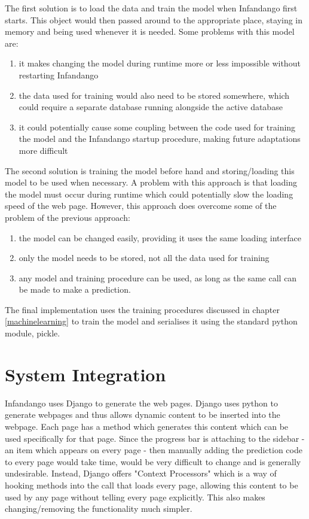 The first solution is to load the data and train the model when Infandango first starts. This object would then passed around to the appropriate place, staying in memory and being used whenever it is needed. Some problems with this model are:

\begin{enumerate}
\item it makes changing the model during runtime more or less impossible without restarting Infandango
\item the data used for training would also need to be stored somewhere, which could require a separate database running alongside the active database \item it could potentially cause some coupling between the code used for training the model and the Infandango startup procedure, making future adaptations more difficult
\end{enumerate}

The second solution is training the model before hand and storing/loading this model to be used when necessary. A problem with this approach is that loading the model must occur during runtime which could potentially slow the loading speed of the web page. However, this approach does overcome some of the problem of the previous approach: 

\begin{enumerate}
\item the model can be changed easily, providing it uses the same loading interface
\item only the model needs to be stored, not all the data used for training
\item any model and training procedure can be used, as long as the same call can be made to make a prediction.
\end{enumerate}

The final implementation uses the training procedures discussed in chapter \ref{machinelearning} to train the model and serialises it using the standard python module, pickle\cite{pythonpickle_site}.

\section{System Integration}
Infandango uses Django to generate the web pages. Django uses python to generate webpages and thus allows dynamic content to be inserted into the webpage. Each page has a method which generates this content which can be used specifically for that page. Since the progress bar is attaching to the sidebar - an item which appears on every page - then manually adding the prediction code to every page would take time, would be very difficult to change and is generally undesirable. Instead, Django offers "Context Processors" which is a way of hooking methods into the call that loads every page, allowing this content to be used by any page without telling every page explicitly. This also makes changing/removing the functionality much simpler. 

